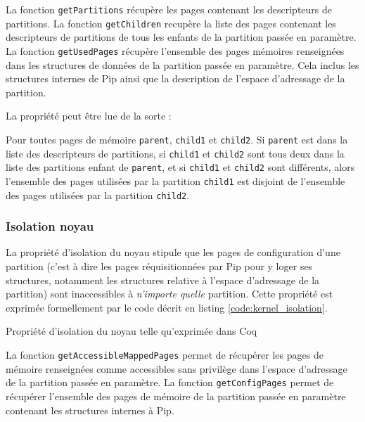 			La fonction \texttt{getPartitions} récupère les pages contenant les descripteurs de partitions. La fonction \texttt{getChildren} recupère la liste des pages contenant les descripteurs de partitions de tous les enfants de la partition passée en paramètre. La fonction \texttt{getUsedPages} récupère l'ensemble des pages mémoires renseignées dans les structures de données de la partition passée en paramètre. Cela inclus les structures internes de Pip ainsi que la description de l'espace d'adressage de la partition.

			La propriété peut être lue de la sorte :
			\begin{theorem}
				Pour toutes pages de mémoire \texttt{parent}, \texttt{child1} et \texttt{child2}. Si \texttt{parent} est dans la liste des descripteurs de partitions, si \texttt{child1} et \texttt{child2} sont tous deux dans la liste des partitions enfant de \texttt{parent}, et si \texttt{child1} et \texttt{child2} sont différents, alors l'ensemble des pages utilisées par la partition \texttt{child1} est disjoint de l'ensemble des pages utilisées par la partition \texttt{child2}.
			\end{theorem}

			\subsubsection{Isolation noyau}
			\label{sec:kernel_isolation}

			La propriété d'isolation du noyau stipule que les pages de configuration d'une partition (c'est à dire les pages réquisitionnées par Pip pour y loger ses structures, notamment les structures relative à l'espace d'adressage de la partition) sont inaccessibles à \emph{n'importe quelle} partition.
			Cette propriété est exprimée formellement par le code décrit en listing \ref{code:kernel_isolation}.

			\begin{listing}[!ht]
				\caption{Propriété d'isolation du noyau telle qu'exprimée dans Coq}
				\label{code:kernel_isolation}
			\end{listing}

			La fonction \texttt{getAccessibleMappedPages} permet de récupérer les pages de mémoire renseignées comme accessibles sans privilège dans l'espace d'adressage de la partition passée en paramètre. La fonction \texttt{getConfigPages} permet de récupérer l'ensemble des pages de mémoire de la partition passée en paramètre contenant les structures internes à Pip.

